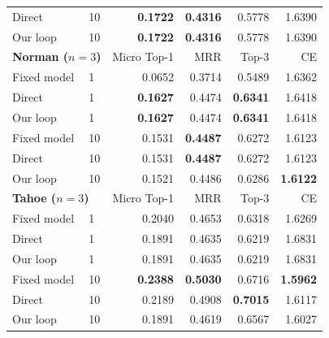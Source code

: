 \begin{longtable}{llrrrr}
Direct & 10 & \textbf{0.1722} & \textbf{0.4316} & 0.5778 & 1.6390 \\
Our loop & 10 & \textbf{0.1722} & \textbf{0.4316} & 0.5778 & 1.6390 \\
\midrule
\multicolumn{2}{l}{\textbf{Norman ($n=3$)}} & Micro Top-1 & MRR & Top-3 & CE \\
Fixed model & 1 & 0.0652 & 0.3714 & 0.5489 & 1.6362 \\
Direct & 1 & \textbf{0.1627} & 0.4474 & \textbf{0.6341} & 1.6418 \\
Our loop & 1 & \textbf{0.1627} & 0.4474 & \textbf{0.6341} & 1.6418 \\
Fixed model & 10 & 0.1531 & \textbf{0.4487} & 0.6272 & 1.6123 \\
Direct & 10 & 0.1531 & \textbf{0.4487} & 0.6272 & 1.6123 \\
Our loop & 10 & 0.1521 & 0.4486 & 0.6286 & \textbf{1.6122} \\
\midrule
\multicolumn{2}{l}{\textbf{Tahoe ($n=3$)}} & Micro Top-1 & MRR & Top-3 & CE \\
Fixed model & 1 & 0.2040 & 0.4653 & 0.6318 & 1.6269 \\
Direct & 1 & 0.1891 & 0.4635 & 0.6219 & 1.6831 \\
Our loop & 1 & 0.1891 & 0.4635 & 0.6219 & 1.6831 \\
Fixed model & 10 & \textbf{0.2388} & \textbf{0.5030} & 0.6716 & \textbf{1.5962} \\
Direct & 10 & 0.2189 & 0.4908 & \textbf{0.7015} & 1.6117 \\
Our loop & 10 & 0.1891 & 0.4619 & 0.6567 & 1.6027 \\
\midrule
\bottomrule
\end{longtable}
